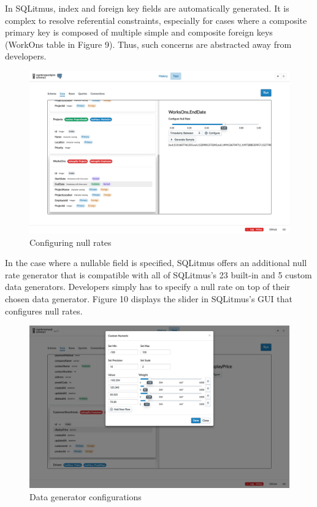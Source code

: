 \documentclass[12pt]{report}
\begin{document}
\begin{spacing}{1.9}
\begin{figure}[H]
		\end{figure}
		
		In SQLitmus, index and foreign key fields are automatically generated. It is complex to resolve referential constraints, especially for cases where a composite primary key is composed of multiple simple and composite foreign keys (WorkOns table in Figure 9). Thus, such concerns are abstracted away from developers.
		
		
		\begin{figure}[H]
			\centering
			\includegraphics[width=\textwidth]{3-2-2b.png}
			\caption{Configuring null rates}
			
		\end{figure}
		
		In the case where a nullable field is specified, SQLitmus offers an additional null rate generator that is compatible with all of SQLitmus's 23 built-in and 5 custom data generators. Developers simply has to specify a null rate on top of their chosen data generator. Figure 10 displays the slider in SQLitmus's GUI that configures null rates.
		
		
		\begin{figure}[H]
			\centering
			\includegraphics[width=\textwidth]{3-2-2c.png}
			\caption{Data generator configurations}
			

\end{figure}
\end{spacing}
\end{document}
